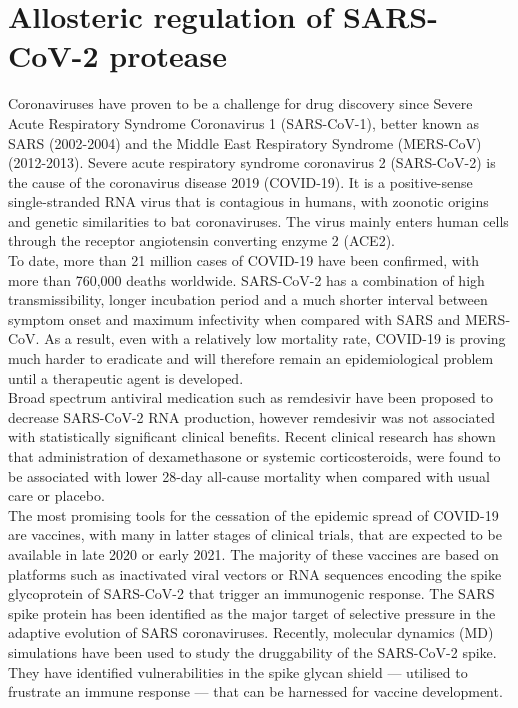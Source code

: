 \chapter{Allosteric regulation of SARS-CoV-2 protease}
\label{Corona}

Coronaviruses have proven to be a challenge for drug discovery since Severe Acute Respiratory Syndrome Coronavirus 1 (SARS-CoV-1), better known as SARS (2002-2004) and the Middle East Respiratory Syndrome (MERS-CoV) (2012-2013). Severe acute respiratory syndrome coronavirus 2 (SARS-CoV-2) is the cause of the coronavirus disease 2019 (COVID-19). It is a positive-sense single-stranded RNA virus that is contagious in humans, with zoonotic origins and genetic similarities to bat coronaviruses.\cite{andersen2020proximal} The virus mainly enters human cells through the receptor angiotensin converting enzyme 2 (ACE2).\cite{shang2020structural} \\

To date, more than 21 million cases of COVID-19 have been confirmed, with more than 760,000 deaths worldwide.\cite{whoreport} SARS-CoV-2 has a combination of high transmissibility, longer incubation period and a much shorter interval between symptom onset and maximum infectivity when compared with SARS and MERS-CoV.\cite{petersen2020comparing} As a result, even with a relatively low mortality rate, COVID-19 is proving much harder to eradicate and will therefore remain an epidemiological problem until a therapeutic agent is developed.\\

Broad spectrum antiviral medication such as remdesivir have been proposed to decrease SARS-CoV-2 RNA production, however remdesivir was not associated with statistically significant clinical benefits.\cite{wang2020} Recent clinical research has shown that administration of dexamethasone\cite{dexamethasone} or systemic corticosteroids,\cite{steroids} were found to be associated with lower 28-day all-cause mortality when compared with usual care or placebo. \\

The most promising tools for the cessation of the epidemic spread of COVID-19 are vaccines, with many in latter stages of clinical trials, that are expected to be available in late 2020 or early 2021.\cite{world2020draft} The majority of these vaccines are based on platforms such as inactivated viral vectors or RNA sequences encoding the spike glycoprotein of SARS-CoV-2 that trigger an immunogenic response. The SARS spike protein has been identified as the major target of selective pressure in the adaptive evolution of SARS coronaviruses.\cite{zhang2006adaptive} Recently, molecular dynamics (MD) simulations have been used to study the druggability of the SARS-CoV-2 spike.\cite{RommieCasalino} They have identified vulnerabilities in the spike glycan shield --- utilised to frustrate an immune response --- that can be harnessed for vaccine development.\\

